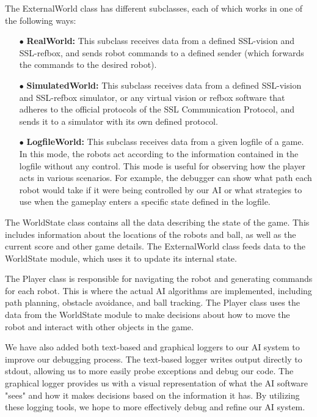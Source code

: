 \documentclass[runningheads]{llncs}
\begin{document}
The ExternalWorld class has different subclasses, each of which works in one of the following ways:

\begin{itemize}
\item[$\bullet$] \textbf{RealWorld:} This subclass receives data from a defined SSL-vision and SSL-refbox, and sends robot commands to a defined sender (which forwards the commands to the desired robot).
\item[$\bullet$] \textbf{SimulatedWorld:} This subclass receives data from a defined SSL-vision and SSL-refbox simulator, or any virtual vision or refbox software that adheres to the official protocols of the SSL Communication Protocol, and sends it to a simulator with its own defined protocol.
\item[$\bullet$] \textbf{LogfileWorld:} This subclass receives data from a given logfile of a game. In this mode, the robots act according to the information contained in the logfile without any control. This mode is useful for observing how the player acts in various scenarios. For example, the debugger can show what path each robot would take if it were being controlled by our AI or what strategies to use when the gameplay enters a specific state defined in the logfile.
\end{itemize}

The WorldState class contains all the data describing the state of the game. This includes information about the locations of the robots and ball, as well as the current score and other game details. The ExternalWorld class feeds data to the WorldState module, which uses it to update its internal state.

The Player class is responsible for navigating the robot and generating commands for each robot. This is where the actual AI algorithms are implemented, including path planning, obstacle avoidance, and ball tracking. The Player class uses the data from the WorldState module to make decisions about how to move the robot and interact with other objects in the game.

We have also added both text-based and graphical loggers to our AI system to improve our debugging process. The text-based logger writes output directly to stdout, allowing us to more easily probe exceptions and debug our code. The graphical logger provides us with a visual representation of what the AI software "sees" and how it makes decisions based on the information it has. By utilizing these logging tools, we hope to more effectively debug and refine our AI system.
\end{document}
